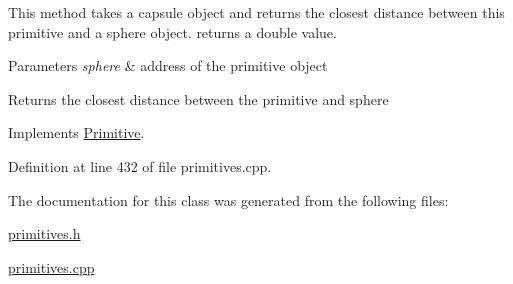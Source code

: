 This method takes a capsule object and returns the closest distance between this primitive and a sphere object. returns a double value.


\begin{DoxyParams}{Parameters}
{\em sphere} & address of the primitive object \\
\hline
\end{DoxyParams}
\begin{DoxyReturn}{Returns}
the closest distance between the primitive and sphere 
\end{DoxyReturn}


Implements \hyperlink{class_primitive_adaac4fc4fedf9cd76d4eb9c77e9ae560}{Primitive}.



Definition at line 432 of file primitives.\+cpp.



The documentation for this class was generated from the following files\+:\begin{DoxyCompactItemize}
\item 
\hyperlink{primitives_8h}{primitives.\+h}\item 
\hyperlink{primitives_8cpp}{primitives.\+cpp}\end{DoxyCompactItemize}
